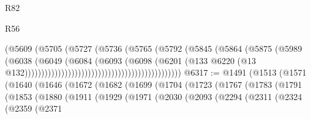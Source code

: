 \begin{lexlean}{R82}
\begin{lexlean}{R56}
\begin{coremodule}
{{{{{{{{{{{{{{{{{{{{{{{{{{{{{{{{{{{{{{{{{{{{{{{{{{{{{{{{{{{{{{{{{{{{{{{{{{{{{{{{{{{{{{{{{{{{{{{{{{{{{{{{{{{{{{{{{{{{{{{{{{{{{{{{{{{{{{{{{{{{{{{{{{{{{{{{{{{{{{{{{{{{{{{{{{{{{{{{{{{{{{{{{{{{{{{{{{{{{{{{{{{{{{{{{{{                                                              (@5609
                                                                (@5705
                                                                  (@5727
                                                                    (@5736
                                                                      (@5765
                                                                        (@5792
                                                                          (@5845
                                                                            (@5864
                                                                              (@5875
                                                                                (@5989
                                                                                  (@6038
                                                                                    (@6049
                                                                                      (@6084
                                                                                        (@6093
                                                                                          (@6098
                                                                                            (@6201
                                                                                              (@133
                                                                                                @6220
                                                                                                (@13
                                                                                                  @132)))))))))))))))))))))))))))))))))))))))))))))))
@6317 := @1491
    (@1513
      (@1571
        (@1640
          (@1646
            (@1672
              (@1682
                (@1699
                  (@1704
                    (@1723
                      (@1767
                        (@1783
                          (@1791
                            (@1853
                              (@1880
                                (@1911
                                  (@1929
                                    (@1971
                                      (@2030
                                        (@2093
                                          (@2294
                                            (@2311
                                              (@2324
                                                (@2359
                                                  (@2371
}}}}}}}}}}}}}}}}}}}}}}}}}}}}}}}}}}}}}}}}}}}}}}}}}}}}}}}}}}}}}}}}}}}}}}}}}}}}}}}}}}}}}}}}}}}}}}}}}}}}}}}}}}}}}}}}}}}}}}}}}}}}}}}}}}}}}}}}}}}}}}}}}}}}}}}}}}}}}}}}}}}}}}}}}}}}}}}}}}}}}}}}}}}}}}}}}}}}}}}}}}}}}}}}}}}
\end{coremodule}
\end{lexlean}
\end{lexlean}
